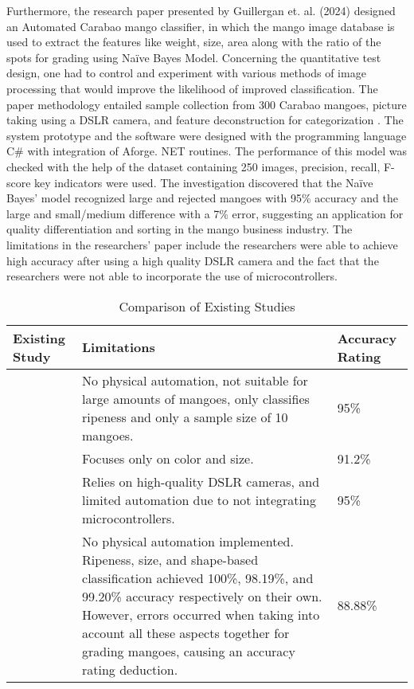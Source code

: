 Furthermore, the research paper presented by Guillergan et. al. (2024) designed an
Automated Carabao mango classifier, in which the mango image database is used to
extract the features like weight, size, area along with the ratio of the spots for grading
using Naïve Bayes Model. Concerning the quantitative test design, one had to control
and experiment with various methods of image processing that would improve the
likelihood of improved classification. The paper methodology entailed sample collection
from 300 Carabao mangoes, picture taking using a DSLR camera, and feature
deconstruction for categorization \cite{guillergan-naive-2024}. The system prototype and
the software were designed with the programming language C\# with integration of
Aforge. NET routines. The performance of this model was checked with the help of the
dataset containing 250 images, precision, recall, F-score key indicators were used. The
investigation discovered that the Naïve Bayes’ model recognized large and rejected
mangoes with 95\% accuracy and the large and small/medium difference with a 7\% error,
suggesting an application for quality differentiation and sorting in the mango business
industry. The limitations in the researchers’ paper include the researchers were able to
achieve high accuracy after using a high quality DSLR camera and the fact that the
researchers were not able to incorporate the use of microcontrollers.

\begin{table}[h]
	\centering
	\caption{Comparison of Existing Studies}
	\label{tab:comparison_existing_studies}
	\renewcommand{\arraystretch}{1.3}
	\begin{tabular}{p{}|p{}|p{}}
		\hline
		\textbf{Existing Study} & \textbf{Limitations} & \textbf{Accuracy Rating} \\
		\hline
		\cite{adam-non-destructive-2022} & No physical automation, not suitable for large amounts of mangoes, only classifies ripeness and only a sample size of 10 mangoes. & 95\% \\
		\hline
		\cite{school-of-engineering-asia-pacific-college-philippines-carabao-2023} & Focuses only on color and size. & 91.2\% \\
		\hline
		\cite{guillergan-naive-2024} & Relies on high-quality DSLR cameras, and limited automation due to not integrating microcontrollers. & 95\% \\
		\hline
		\cite{supekar-multi-parameter-2020} & No physical automation implemented. Ripeness, size, and shape-based classification achieved 100\%, 98.19\%, and 99.20\% accuracy respectively on their own. However, errors occurred when taking into account all these aspects together for grading mangoes, causing an accuracy rating deduction. & 88.88\% \\
		\hline
	\end{tabular}
\end{table}

